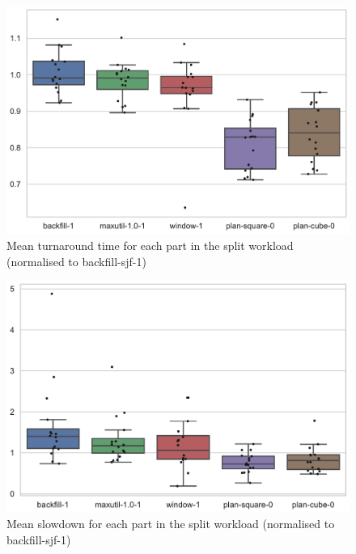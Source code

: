 \documentclass[thesis-en.tex]{subfiles}
\begin{document}
\begin{figure}[p]
    \centering
    \includegraphics[width=\textwidth]{best_io-aware_parts_turnaround-time_box.pdf}
    \caption{Mean turnaround time for each part in the split workload (normalised to backfill-sjf-1)}
    \label{fig:best_io-aware_parts_turnaround-time_box}
\end{figure}

\begin{figure}[p]
    \centering
    \includegraphics[width=\textwidth]{best_io-aware_parts_slowdown_box.pdf}
    \caption{Mean slowdown for each part in the split workload (normalised to backfill-sjf-1)}
    \label{fig:best_io-aware_parts_slowdown_box}
\end{figure}
\end{document}
